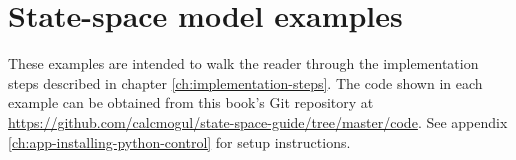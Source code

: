 
\chapter{State-space model examples}

These examples are intended to walk the reader through the implementation steps
described in chapter \ref{ch:implementation-steps}. The code shown in each
example can be obtained from this book's Git repository at
\url{https://github.com/calcmogul/state-space-guide/tree/master/code}. See
appendix \ref{ch:app-installing-python-control} for setup instructions.







